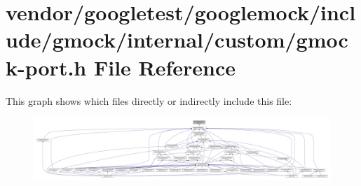 \hypertarget{custom_2gmock-port_8h}{}\section{vendor/googletest/googlemock/include/gmock/internal/custom/gmock-\/port.h File Reference}
\label{custom_2gmock-port_8h}
This graph shows which files directly or indirectly include this file\+:\nopagebreak
\begin{figure}[H]
\begin{center}
\leavevmode
\includegraphics[width=350pt]{custom_2gmock-port_8h__dep__incl}
\end{center}
\end{figure}
